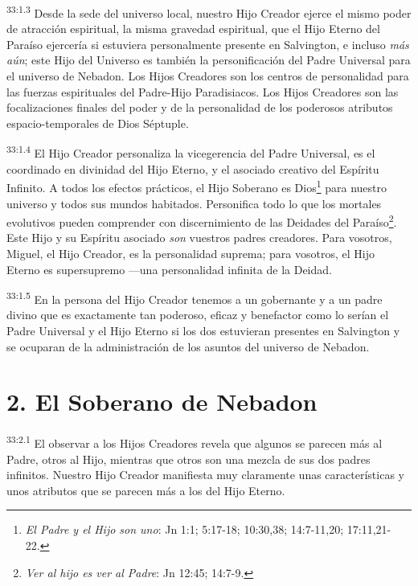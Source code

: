 \par
\textsuperscript{33:1.3} Desde la sede del universo local, nuestro Hijo Creador ejerce el mismo poder de atracción espiritual, la misma gravedad espiritual, que el Hijo Eterno del Paraíso ejercería si estuviera personalmente presente en Salvington, e incluso \textit{más aún}; este Hijo del Universo es también la personificación del Padre Universal para el universo de Nebadon. Los Hijos Creadores son los centros de personalidad para las fuerzas espirituales del Padre-Hijo Paradisiacos. Los Hijos Creadores son las focalizaciones finales del poder y de la personalidad de los poderosos atributos espacio-temporales de Dios Séptuple.

\par
\textsuperscript{33:1.4} El Hijo Creador personaliza la vicegerencia del Padre Universal, es el coordinado en divinidad del Hijo Eterno, y el asociado creativo del Espíritu Infinito. A todos los efectos prácticos, el Hijo Soberano es Dios\footnote{\textit{El Padre y el Hijo son uno}: Jn 1:1; 5:17-18; 10:30,38; 14:7-11,20; 17:11,21-22.} para nuestro universo y todos sus mundos habitados. Personifica todo lo que los mortales evolutivos pueden comprender con discernimiento de las Deidades del Paraíso\footnote{\textit{Ver al hijo es ver al Padre}: Jn 12:45; 14:7-9.}. Este Hijo y su Espíritu asociado \textit{son} vuestros padres creadores. Para vosotros, Miguel, el Hijo Creador, es la personalidad suprema; para vosotros, el Hijo Eterno es supersupremo ---una personalidad infinita de la Deidad.

\par
\textsuperscript{33:1.5} En la persona del Hijo Creador tenemos a un gobernante y a un padre divino que es exactamente tan poderoso, eficaz y benefactor como lo serían el Padre Universal y el Hijo Eterno si los dos estuvieran presentes en Salvington y se ocuparan de la administración de los asuntos del universo de Nebadon.

\section*{2. El Soberano de Nebadon}
\par
\textsuperscript{33:2.1} El observar a los Hijos Creadores revela que algunos se parecen más al Padre, otros al Hijo, mientras que otros son una mezcla de sus dos padres infinitos. Nuestro Hijo Creador manifiesta muy claramente unas características y unos atributos que se parecen más a los del Hijo Eterno.

